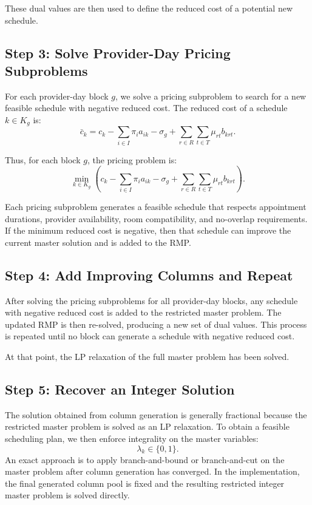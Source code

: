 \documentclass[12pt]{article}
\begin{document}
These dual values are then used to define the reduced cost of a potential new schedule.

\subsection*{Step 3: Solve Provider-Day Pricing Subproblems}

For each provider-day block $g$, we solve a pricing subproblem to search for a new feasible
schedule with negative reduced cost. The reduced cost of a schedule $k \in K_g$ is:
\[
  \bar{c}_k = c_k - \sum_{i \in I} \pi_i a_{ik} - \sigma_g + \sum_{r \in R} \sum_{t \in T} \mu_{rt} b_{krt}.
\]

Thus, for each block $g$, the pricing problem is:
\[
  \min_{k \in K_g} \left( c_k - \sum_{i \in I} \pi_i a_{ik} - \sigma_g + \sum_{r \in R} \sum_{t \in T} \mu_{rt} b_{krt} \right).
\]

Each pricing subproblem generates a feasible schedule that respects appointment durations,
provider availability, room compatibility, and no-overlap requirements. If the minimum reduced
cost is negative, then that schedule can improve the current master solution and is added to the RMP.

\subsection*{Step 4: Add Improving Columns and Repeat}

After solving the pricing subproblems for all provider-day blocks, any schedule with negative
reduced cost is added to the restricted master problem. The updated RMP is then re-solved,
producing a new set of dual values. This process is repeated until no block can generate a
schedule with negative reduced cost.

At that point, the LP relaxation of the full master problem has been solved.

\subsection*{Step 5: Recover an Integer Solution}

The solution obtained from column generation is generally fractional because the restricted
master problem is solved as an LP relaxation. To obtain a feasible scheduling plan, we then
enforce integrality on the master variables:
\[
  \lambda_k \in \{0, 1\}.
\]
An exact approach is to apply branch-and-bound or branch-and-cut on the master problem
after column generation has converged. In the implementation, the final generated column pool
is fixed and the resulting restricted integer master problem is solved directly.
\end{document}
